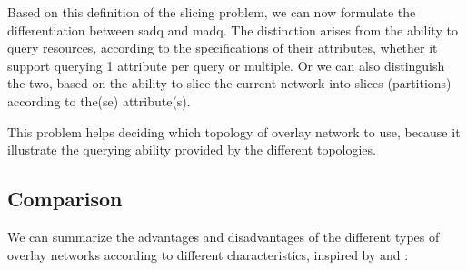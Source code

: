 \documentclass[12pt, titlepage]{uo_temp}
\begin{document}
     Based on this definition of the slicing problem, we can now formulate the
     differentiation between \gls{sadq} and \gls{madq}. The distinction arises from the
     ability to query resources, according to the specifications of their attributes,
     whether it support querying 1 attribute per query or multiple. Or we can also
     distinguish the two, based on the ability to slice the current network into slices
     (partitions) according to the(se) attribute(s).
     
     This problem helps deciding which topology of overlay network to use, because it
     illustrate the querying ability provided by the different topologies. 

     \clearpage 
     \subsection{Comparison}
     We can summarize the advantages and disadvantages of the different types of overlay
     networks according to different characteristics, inspired by \cite{lua2005survey} and
     \cite{p2p_collab}:
    
\end{document}

